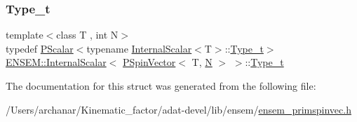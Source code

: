 \mbox{\label{structENSEM_1_1InternalScalar_3_01PSpinVector_3_01T_00_01N_01_4_01_4_a65d7d95d2a184abe920b5589a148ce04}} 
\subsubsection{\texorpdfstring{Type\_t}{Type\_t}\hspace{0.1cm}{\footnotesize\ttfamily [3/3]}}
{\footnotesize\ttfamily template$<$class T , int N$>$ \\
typedef \mbox{\hyperlink{classENSEM_1_1PScalar}{P\+Scalar}}$<$typename \mbox{\hyperlink{structENSEM_1_1InternalScalar}{Internal\+Scalar}}$<$T$>$\+::\mbox{\hyperlink{structENSEM_1_1InternalScalar_3_01PSpinVector_3_01T_00_01N_01_4_01_4_a65d7d95d2a184abe920b5589a148ce04}{Type\+\_\+t}}$>$ \mbox{\hyperlink{structENSEM_1_1InternalScalar}{E\+N\+S\+E\+M\+::\+Internal\+Scalar}}$<$ \mbox{\hyperlink{classENSEM_1_1PSpinVector}{P\+Spin\+Vector}}$<$ T, \mbox{\hyperlink{adat__devel_2lib_2hadron_2operator__name__util_8cc_a7722c8ecbb62d99aee7ce68b1752f337}{N}} $>$ $>$\+::\mbox{\hyperlink{structENSEM_1_1InternalScalar_3_01PSpinVector_3_01T_00_01N_01_4_01_4_a65d7d95d2a184abe920b5589a148ce04}{Type\+\_\+t}}}



The documentation for this struct was generated from the following file\+:\begin{DoxyCompactItemize}
\item 
/\+Users/archanar/\+Kinematic\+\_\+factor/adat-\/devel/lib/ensem/\mbox{\hyperlink{adat-devel_2lib_2ensem_2ensem__primspinvec_8h}{ensem\+\_\+primspinvec.\+h}}\end{DoxyCompactItemize}
